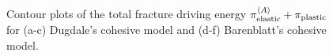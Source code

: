 \begin{figure}[!htb]
\begin{subfigure}{0.23\textwidth}
        \caption{}
    \end{subfigure}
    \caption{ Contour plots of the total fracture driving energy $\pi_{\text{elastic}}^{\left< A \right>} + \pi_{\text{plastic}}$ for (a-c) Dugdale's cohesive model and (d-f) Barenblatt's cohesive model. }
\end{figure}
